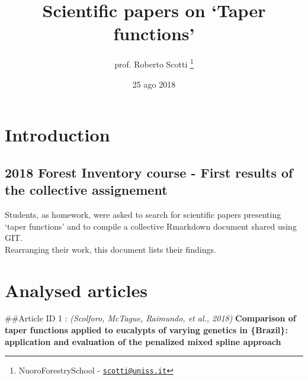 \documentclass[]{article}
\title{Scientific papers on `Taper functions'}
\author{prof. Roberto Scotti \footnote{NuoroForestrySchool -
  \href{mailto:scotti@uniss.it}{\nolinkurl{scotti@uniss.it}}}}
\date{25 ago 2018}
\begin{document}
\maketitle

\hypertarget{introduction}{%
\section{Introduction}\label{introduction}}

\hypertarget{forest-inventory-course---first-results-of-the-collective-assignement}{%
\subsection{2018 Forest Inventory course - First results of the
collective
assignement}\label{forest-inventory-course---first-results-of-the-collective-assignement}}

Students, as homework, were asked to search for scientific papers
presenting `taper functions' and to compile a collective Rmarkdown
document shared using GIT.\\
Rearranging their work, this document lists their findings.

\hypertarget{analysed-articles}{%
\section{Analysed articles}\label{analysed-articles}}

\#\#Article ID 1 : \emph{(Scolforo, McTague, Raimundo, et al., 2018)}
\textbf{Comparison of taper functions applied to eucalypts of varying
genetics in \{Brazil\}: application and evaluation of the penalized
mixed spline approach}
\end{document}
